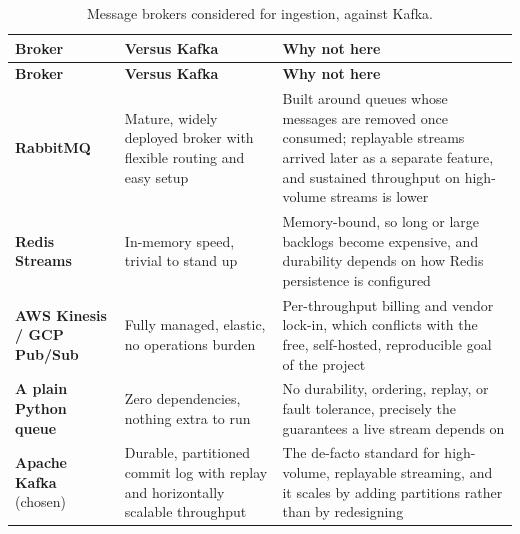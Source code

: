 \begin{longtable}{@{}
  >{\raggedright\arraybackslash}p{}
  >{\raggedright\arraybackslash}p{}
  >{\raggedright\arraybackslash}p{}@{}}
\caption{Message brokers considered for ingestion, against Kafka.}\label{tab:brokers}\tabularnewline
\toprule
\textbf{Broker} & \textbf{Versus Kafka} & \textbf{Why not here} \\
\midrule
\endfirsthead
\toprule
\textbf{Broker} & \textbf{Versus Kafka} & \textbf{Why not here} \\
\midrule
\endhead
\bottomrule
\endlastfoot

\textbf{RabbitMQ} & Mature, widely deployed broker with flexible routing and easy setup & Built around queues whose messages are removed once consumed; replayable streams arrived later as a separate feature, and sustained throughput on high-volume streams is lower \\
\addlinespace[1em]

\textbf{Redis Streams} & In-memory speed, trivial to stand up & Memory-bound, so long or large backlogs become expensive, and durability depends on how Redis persistence is configured \\
\addlinespace[1em]

\textbf{AWS Kinesis / GCP Pub/Sub} & Fully managed, elastic, no operations burden & Per-throughput billing and vendor lock-in, which conflicts with the free, self-hosted, reproducible goal of the project \\
\addlinespace[1em]

\textbf{A plain Python queue} & Zero dependencies, nothing extra to run & No durability, ordering, replay, or fault tolerance, precisely the guarantees a live stream depends on \\
\addlinespace[1em]

\textbf{Apache Kafka} (chosen) & Durable, partitioned commit log with replay and horizontally scalable throughput & The de-facto standard for high-volume, replayable streaming, and it scales by adding partitions rather than by redesigning \\

\end{longtable}
\renewcommand{\arraystretch}{1.0}

